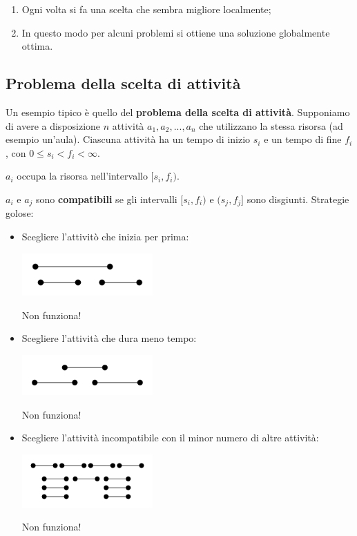 \begin{enumerate}

\item Ogni volta si fa una scelta che sembra migliore localmente;
\item In questo modo per alcuni problemi si ottiene una soluzione globalmente ottima.

\end{enumerate}

\subsection{Problema della scelta di attività}

Un esempio tipico è quello del \textbf{problema della scelta di attività}. Supponiamo di avere a disposizione $n$ attività $a_1,a_2,...,a_n$ che utilizzano la stessa risorsa (ad esempio un'aula). Ciascuna attività ha un tempo di inizio $s_i$ e un tempo di fine $f_i$, con $0\le s_i < f_i < \infty$.

$a_i$ occupa la risorsa nell'intervallo $[s_i,f_i)$.

$a_i$ e $a_j$ sono \textbf{compatibili} se gli intervalli $[s_i,f_i)$ e $(s_j,f_j]$ sono disgiunti.
\linebreak[2]
Strategie golose:

\begin{itemize}

\item Scegliere l'attivitò che inizia per prima:

\includegraphics[width=50mm]{images/activity1.png}

Non funziona!

\item Scegliere l'attività che dura meno tempo:

\includegraphics[width=50mm]{images/activity2.png}

Non funziona!

\item Scegliere l'attività incompatibile con il minor numero di altre attività:

\includegraphics[width=50mm]{images/activity3.png}

Non funziona!

\end{itemize}

